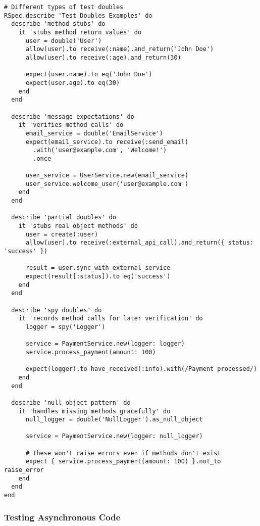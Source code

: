 \documentclass[12pt,a4paper]{article}
\begin{document}
\begin{lstlisting}
# Different types of test doubles
RSpec.describe 'Test Doubles Examples' do
  describe 'method stubs' do
    it 'stubs method return values' do
      user = double('User')
      allow(user).to receive(:name).and_return('John Doe')
      allow(user).to receive(:age).and_return(30)
      
      expect(user.name).to eq('John Doe')
      expect(user.age).to eq(30)
    end
  end

  describe 'message expectations' do
    it 'verifies method calls' do
      email_service = double('EmailService')
      expect(email_service).to receive(:send_email)
        .with('user@example.com', 'Welcome!')
        .once
        
      user_service = UserService.new(email_service)
      user_service.welcome_user('user@example.com')
    end
  end

  describe 'partial doubles' do
    it 'stubs real object methods' do
      user = create(:user)
      allow(user).to receive(:external_api_call).and_return({ status: 'success' })
      
      result = user.sync_with_external_service
      expect(result[:status]).to eq('success')
    end
  end

  describe 'spy doubles' do
    it 'records method calls for later verification' do
      logger = spy('Logger')
      
      service = PaymentService.new(logger: logger)
      service.process_payment(amount: 100)
      
      expect(logger).to have_received(:info).with(/Payment processed/)
    end
  end

  describe 'null object pattern' do
    it 'handles missing methods gracefully' do
      null_logger = double('NullLogger').as_null_object
      
      service = PaymentService.new(logger: null_logger)
      
      # These won't raise errors even if methods don't exist
      expect { service.process_payment(amount: 100) }.not_to raise_error
    end
  end
end
\end{lstlisting}

\subsubsection{Testing Asynchronous Code}
\end{document}
